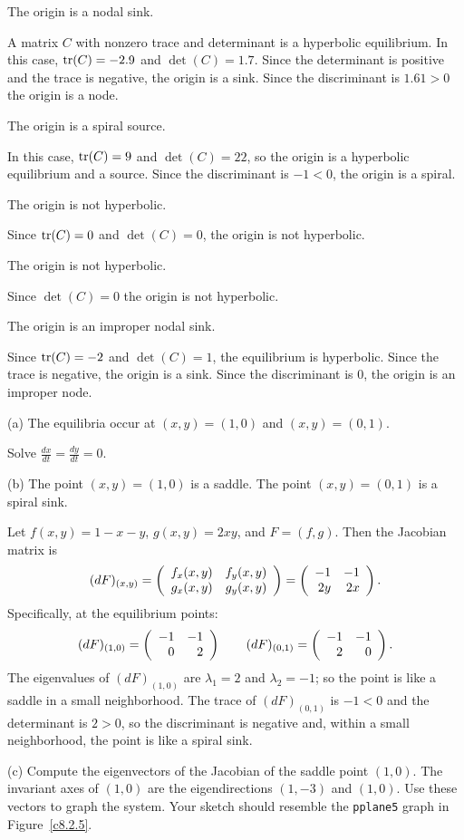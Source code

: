  \ans The origin is a nodal sink.

\soln A matrix $C$ with nonzero trace and determinant is a hyperbolic
equilibrium.  In this case, ${\rm tr}(C) = -2.9$ and $\det(C) = 1.7$.
Since the determinant is positive and the trace is negative, the origin
is a sink. Since the discriminant is $1.61>0$ the origin is a node.

 \ans The origin is a spiral source.

\soln In this case, ${\rm tr}(C) = 9$ and $\det(C) = 22$, so the origin
is a hyperbolic equilibrium and a source.  Since the discriminant is 
$-1<0$, the origin is a spiral.

 \ans The origin is not hyperbolic.

\soln Since ${\rm tr}(C) = 0$ and $\det(C) = 0$, the origin is not 
hyperbolic. 

 \ans The origin is not hyperbolic.

\soln Since $\det(C) = 0$ the origin is not hyperbolic.

 \ans The origin is an improper nodal sink.

\soln Since ${\rm tr}(C) = -2$ and $\det(C) = 1$, the equilibrium
is hyperbolic. Since the trace is negative, the origin is a sink.
Since the discriminant is $0$, the origin is an improper node. 

(a) \ans The equilibria occur at $(x,y) = (1,0)$ and $(x,y) = (0,1)$.

\soln Solve $\frac{dx}{dt} = \frac{dy}{dt} = 0$.

(b) \ans The point $(x,y) = (1,0)$ is a saddle.  The point $(x,y) = (0,1)$
is a spiral sink.

\soln Let $f(x,y) = 1 - x - y$, $g(x,y) = 2xy$,
and $F = (f,g)$.  Then the Jacobian matrix is
\[
(dF)_{(x,y)} = \left(\begin{array}{rr} f_x(x,y) & f_y(x,y)\\ g_x(x,y) &g_y(x,y)\end{array}\right)
= \left(\begin{array}{rr} -1 & -1\\ 2y &2x\end{array}\right).
\]
Specifically, at the equilibrium points:
\[
(dF)_{(1,0)} = \left(\begin{array}{rr} -1 & -1\\ 0 &2\end{array}\right) \qquad
(dF)_{(0,1)} = \left(\begin{array}{rr} -1 & -1\\ 2 &0\end{array}\right).
\]
The eigenvalues of $(dF)_{(1,0)}$ are $\lambda_1 = 2$ and $\lambda_2 = -1$;
so the point is like a saddle in a small neighborhood.  The trace of
$(dF)_{(0,1)}$ is $-1 < 0$ and the determinant is $2 > 0$, so the
discriminant is negative and, within a small neighborhood, the point
is like a spiral sink.

(c) Compute the eigenvectors of the Jacobian of the saddle point $(1,0)$.
The invariant axes of $(1,0)$ are the eigendirections $(1,-3)$ and
$(1,0)$.  Use these vectors to graph the system.  Your sketch should
resemble the {\tt pplane5} graph in Figure~\ref{c8.2.5}.

